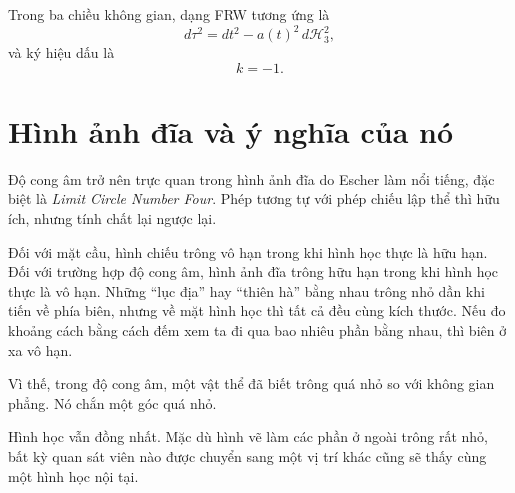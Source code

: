 Trong ba chiều không gian, dạng FRW tương ứng là
\begin{equation}
d\tau^2=dt^2-a(t)^2\,d\mathcal H_3^2,
\end{equation}
và ký hiệu dấu là
\begin{equation}
k=-1.
\end{equation}

\section{Hình ảnh đĩa và ý nghĩa của nó}

Độ cong âm trở nên trực quan trong hình ảnh đĩa do Escher làm nổi tiếng, đặc biệt là \emph{Limit Circle Number Four}. Phép tương tự với phép chiếu lập thể thì hữu ích, nhưng tính chất lại ngược lại.

Đối với mặt cầu, hình chiếu trông vô hạn trong khi hình học thực là hữu hạn. Đối với trường hợp độ cong âm, hình ảnh đĩa trông hữu hạn trong khi hình học thực là vô hạn. Những ``lục địa'' hay ``thiên hà'' bằng nhau trông nhỏ dần khi tiến về phía biên, nhưng về mặt hình học thì tất cả đều cùng kích thước. Nếu đo khoảng cách bằng cách đếm xem ta đi qua bao nhiêu phần bằng nhau, thì biên ở xa vô hạn.

Vì thế, trong độ cong âm, một vật thể đã biết trông quá nhỏ so với không gian phẳng. Nó chắn một góc quá nhỏ.

Hình học vẫn đồng nhất. Mặc dù hình vẽ làm các phần ở ngoài trông rất nhỏ, bất kỳ quan sát viên nào được chuyển sang một vị trí khác cũng sẽ thấy cùng một hình học nội tại.

\begin{classroomqa}
\end{classroomqa}

\begin{classroomqa}
\end{classroomqa}

\begin{classroomqa}
\end{classroomqa}

